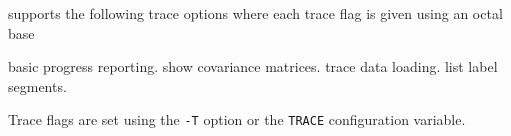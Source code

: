 
 supports the following trace options where each
trace flag is given using an octal base
\begin{optlist}
    basic progress reporting.
    show covariance matrices.
    trace data loading.
    list label segments.
\end{optlist}
Trace flags are set using the \texttt{-T} option or the  \texttt{TRACE} 
configuration variable.


